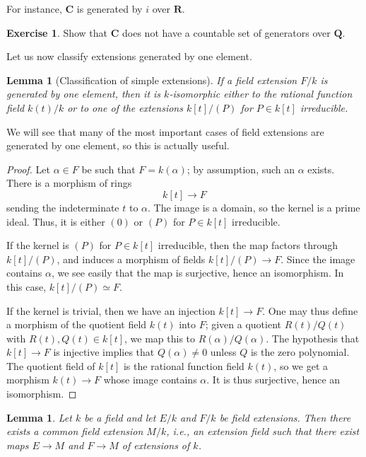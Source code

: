 \documentclass{stacks-project}
\theoremstyle{plain}
\newtheorem{lemma}[subsection]{Lemma}
\theoremstyle{definition}
\newtheorem{exercise}[subsection]{Exercise}
\theoremstyle{remark}
\numberwithin{equation}{subsection}
\begin{document}
\noindent
For instance, $\mathbf{C}$ is generated by $i$ over $\mathbf{R}$.

\begin{exercise}
\label{exercise-C-not-countably-generated}
Show that $\mathbf{C}$ does not have a countable set of generators over
$\mathbf{Q}$.
\end{exercise}

\noindent
Let us now classify extensions generated by one element.

\begin{lemma}[Classification of simple extensions]
\label{lemma-field-extension-generated-by-one-element}
If a field extension $F/k$ is generated by one element, then it is
$k$-isomorphic either to the rational function field $k(t)/k$ or to one
of the extensions $k[t]/(P)$ for $P \in k[t]$ irreducible.
\end{lemma}

\noindent
We will see that many of the most important cases of field extensions are
generated by one element, so this is actually useful.

\begin{proof}
Let $\alpha \in F$ be such that $F = k(\alpha)$; by assumption, such an
$\alpha$ exists. There is a morphism of rings
$$
k[t] \to F
$$
sending the indeterminate $t$ to $\alpha$. The image is a domain, so the
kernel is a prime ideal. Thus, it is either $(0)$ or $(P)$ for $P \in k[t]$
irreducible.

\medskip\noindent
If the kernel is $(P)$ for $P \in k[t]$ irreducible, then the map factors
through $k[t]/(P)$, and induces a morphism of fields $k[t]/(P) \to F$. Since
the image contains $\alpha$, we see easily that the map is surjective, hence
an isomorphism. In this case, $k[t]/(P) \simeq F$.

\medskip\noindent
If the kernel is trivial, then we have an injection $k[t] \to F$.
One may thus define a morphism of the quotient field $k(t)$ into $F$; given a
quotient $R(t)/Q(t)$ with $R(t), Q(t) \in k[t]$, we map this to
$R(\alpha)/Q(\alpha)$. The hypothesis that $k[t] \to F$ is injective implies
that $Q(\alpha) \neq 0$ unless $Q$ is the zero polynomial.
The quotient field of $k[t]$ is the rational function field $k(t)$, so we get
a morphism $k(t) \to F$
whose image contains $\alpha$. It is thus surjective, hence an isomorphism.
\end{proof}

\begin{lemma}
\label{lemma-common-extension-field}
Let $k$ be a field and let $E/k$ and $F/k$ be field extensions.
Then there exists a common field extension $M/k$, i.e., an extension
field such that there exist maps $E \to M$ and $F \to M$ of extensions of $k$.
\end{lemma}
\end{document}
